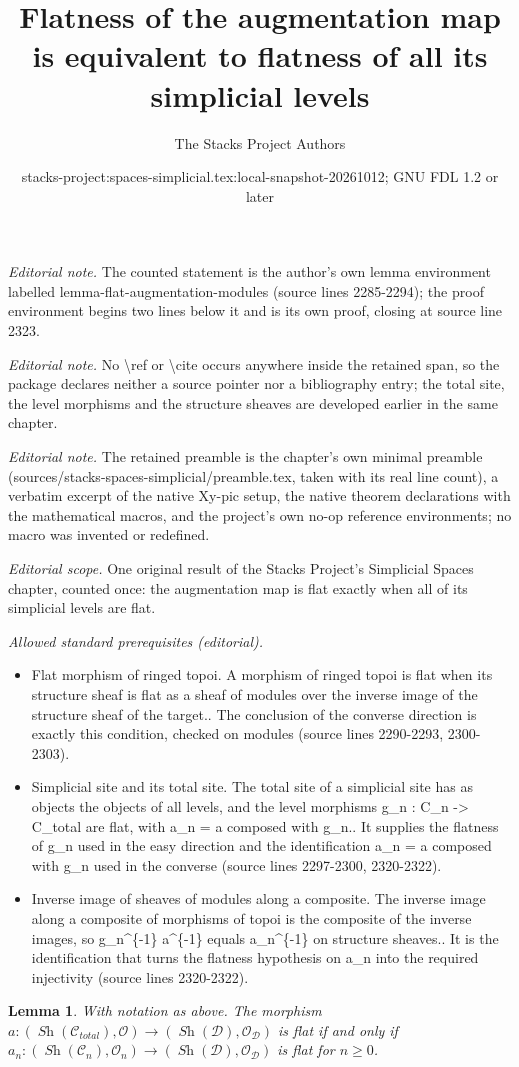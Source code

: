 \documentclass{stacks-project}
\title{Flatness of the augmentation map is equivalent to flatness of all its simplicial levels}
\author{The Stacks Project Authors}
\date{stacks-project:spaces-simplicial.tex:local-snapshot-20261012; GNU FDL 1.2 or later}
\theoremstyle{plain}
\newtheorem{lemma}[subsection]{Lemma}
\theoremstyle{definition}
\theoremstyle{remark}
\numberwithin{equation}{subsection}
\def\Sh{\mathop{\mathit{Sh}}\nolimits}
\begin{document}
\maketitle
\noindent\textit{Editorial note.} The counted statement is the author's own lemma environment labelled lemma-flat-augmentation-modules (source lines 2285-2294); the proof environment begins two lines below it and is its own proof, closing at source line 2323.\par\medskip
\noindent\textit{Editorial note.} No \textbackslash{}ref or \textbackslash{}cite occurs anywhere inside the retained span, so the package declares neither a source pointer nor a bibliography entry; the total site, the level morphisms and the structure sheaves are developed earlier in the same chapter.\par\medskip
\noindent\textit{Editorial note.} The retained preamble is the chapter's own minimal preamble (sources/stacks-spaces-simplicial/preamble.tex, taken with its real line count), a verbatim excerpt of the native Xy-pic setup, the native theorem declarations with the mathematical macros, and the project's own no-op reference environments; no macro was invented or redefined.\par\medskip
\noindent\textit{Editorial scope.} One original result of the Stacks Project's Simplicial Spaces chapter, counted once: the augmentation map is flat exactly when all of its simplicial levels are flat.\par\medskip
\noindent\textit{Allowed standard prerequisites (editorial).}\begin{itemize}
\item Flat morphism of ringed topoi. A morphism of ringed topoi is flat when its structure sheaf is flat as a sheaf of modules over the inverse image of the structure sheaf of the target.. The conclusion of the converse direction is exactly this condition, checked on modules (source lines 2290-2293, 2300-2303).
\item Simplicial site and its total site. The total site of a simplicial site has as objects the objects of all levels, and the level morphisms g\_n : C\_n -> C\_total are flat, with a\_n = a composed with g\_n.. It supplies the flatness of g\_n used in the easy direction and the identification a\_n = a composed with g\_n used in the converse (source lines 2297-2300, 2320-2322).
\item Inverse image of sheaves of modules along a composite. The inverse image along a composite of morphisms of topoi is the composite of the inverse images, so g\_n\textasciicircum{}\{-1\} a\textasciicircum{}\{-1\} equals a\_n\textasciicircum{}\{-1\} on structure sheaves.. It is the identification that turns the flatness hypothesis on a\_n into the required injectivity (source lines 2320-2322).
\end{itemize}\medskip
\begin{lemma}
\label{lemma-flat-augmentation-modules}
With notation as above. The morphism
$a : (\Sh(\mathcal{C}_{total}), \mathcal{O}) \to
(\Sh(\mathcal{D}), \mathcal{O}_\mathcal{D})$
is flat if and only if
$a_n : (\Sh(\mathcal{C}_n), \mathcal{O}_n) \to
(\Sh(\mathcal{D}), \mathcal{O}_\mathcal{D})$
is flat for $n \geq 0$.
\end{lemma}
\end{document}
